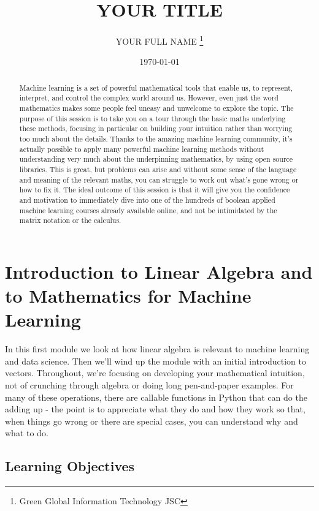 \documentclass{article}
\title{YOUR TITLE}
\author{YOUR FULL NAME \thanks{Green Global Information Technology JSC}}
\date{\today}
\begin{document}
\maketitle

\begin{abstract}
Machine learning is a set of powerful mathematical tools that enable us, to represent, interpret, and control the complex world around us.
However, even just the word mathematics makes some people feel uneasy and unwelcome to explore the topic.
The purpose of this session is to take you on a tour through the basic maths underlying these methods, focusing in particular on building your intuition rather than worrying too much about the details.
Thanks to the amazing machine learning community, it's actually possible to apply many powerful machine learning methods without understanding very much about the underpinning mathematics, by using open source libraries.
This is great, but problems can arise and without some sense of the language and meaning of the relevant maths, you can struggle to work out what's gone wrong or how to fix it.
The ideal outcome of this session is that it will give you the confidence and motivation to immediately dive into one of the hundreds of boolean applied machine learning courses already available online, and not be intimidated by the matrix notation or the calculus.
\end{abstract}

\section{Introduction to Linear Algebra and to Mathematics for Machine Learning}

In this first module we look at how linear algebra is relevant to machine learning and data science. Then we'll wind up the module with an initial introduction to vectors. Throughout, we're focusing on developing your mathematical intuition, not of crunching through algebra or doing long pen-and-paper examples. For many of these operations, there are callable functions in Python that can do the adding up - the point is to appreciate what they do and how they work so that, when things go wrong or there are special cases, you can understand why and what to do.

\subsection{Learning Objectives}
\end{document}
